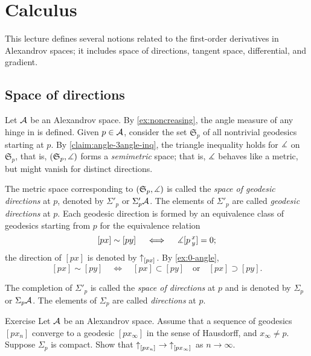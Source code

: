 
\chapter{Calculus}\label{chap:derivative}

This lecture defines several notions related to the first-order derivatives in Alexandrov spaces;
it includes space of directions, tangent space, differential, and gradient.

\section{Space of directions} 
\label{sec:space+directions}

Let $\mathcal{A}$ be an Alexandrov space.
By \ref{ex:noncreasing}, the angle measure of any hinge in is defined.
Given $p\in \mathcal{A}$, consider the set $\mathfrak{S}_p$ of all nontrivial geodesics starting at $p$.
By \ref{claim:angle-3angle-inq}, the triangle inequality holds for $\measuredangle$ on $\mathfrak{S}_p$,
that is, $(\mathfrak{S}_p,\measuredangle)$ 
forms a \emph{semimetric} space;
that is, $\measuredangle$ behaves like a metric, but might vanish for distinct directions. 

The metric space corresponding to  $(\mathfrak{S}_p,\measuredangle)$ is called the \emph{space of geodesic directions} at $p$, denoted by $\Sigma'_p$ or $\Sigma'_p\mathcal{A}$.
The elements of $\Sigma'_p$ are called \emph{geodesic directions} at $p$.
Each geodesic direction is formed by an equivalence class of geodesics starting from $p$ 
for the equivalence relation 
\[[px]\sim[py]\quad \iff\quad \measuredangle[p\,{}^{x}_{y}]=0;\]
the direction of $[px]$ is denoted by ${\uparrow}_{[{p}{x}]_{{}}} $.
By \ref{ex:0-angle}, 
\[[px]\sim[py]
\quad\iff\quad
[px]\subset [py]
\quad\text{or}\quad
[px]\supset[py].
\]
 
The completion of $\Sigma'_p$ is called the \emph{space of directions} at $p$ and is denoted by $\Sigma_p$ or $\Sigma_p\mathcal{A}$.
The elements of $\Sigma_p$ are called \emph{directions} at $p$.

\begin{thm}{Exercise}\label{ex:dir-compact}
Let $\mathcal{A}$ be an Alexandrov space.
Assume that a sequence of geodesics $[px_n]$ converge to a geodesic $[px_\infty]$ in the sense of Hausdorff,
and $x_\infty\ne p$.
Suppose $\Sigma_p$ is compact.
Show that ${\uparrow}_{[{p}{x_n}]_{{}}}\to{\uparrow}_{[{p}{x_\infty}]_{{}}}$ as $n\to\infty$.

\end{thm}


